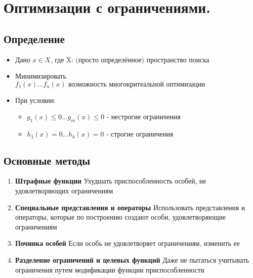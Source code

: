 \section{Оптимизации с ограничениями.}

\subsection{Определение}
\begin{itemize}
    \item Дано $x \in X \text{, где X: (просто определённое) пространство поиска} $
    \item Минимизировать $f_{1}(x) \dots f_{n}(x) \text{ возможность многокритеальной оптимизации} $
    \item При условии:
    \begin{itemize}
        \item $g_{1}(x) \leq 0 \dots g_{m}(x) \leq 0 \text{ -  нестрогие ограничения} $
        \item $h_{1}(x) = 0 \dots h_{k}(x) = 0 \text{ - строгие ограничения} $
    \end{itemize}
\end{itemize}

\subsection{Основные методы}

\begin{enumerate}
    \item \textbf{Штрафные функции}
    \subitem Ухудшать приспособленность особей, не удовлетворяющих ограничениям
    \item \textbf{Специальные представления и операторы}
    \subitem  Использовать представления и операторы, которые по построению создают особи, удовлетворяющие ограничениям
    \item \textbf{Починка особей}
    \subitem  Если особь не удовлетворяет ограничениям, изменить ее
    \item \textbf{Разделение ограничений и целевых функций}
    \subitem Даже не пытаться учитывать ограничения путем модификации функции приспособленности
\end{enumerate}
